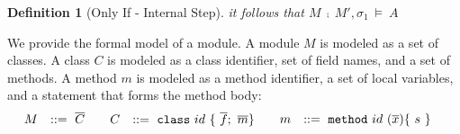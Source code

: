 \documentclass[12pt]{article}
\newcommand\intstep{\hspace{1.5mm}{\raisebox{3pt}{$\bullet$}}\hspace{-1.5mm}{\hookrightarrow}}
\newcommand\hoare[3]{\{#1\}\ #2\ \{#3\}}
\newcommand\hoareIf[4]{#1,\ #2,\ \{#3\}\ \intstep\ #4}
\newcommand\access[2]{\langle #1\ \texttt{access}\ #2 \rangle}
\newcommand\external[1]{\langle #1\ \texttt{external}\rangle}
\newtheorem{definition}{Definition}
\numberwithin{case}{lemma}
\numberwithin{case}{theorem}
\numberwithin{subcase}{case}
\begin{document}
{\begin{definition}[Only If - Internal Step]
it follows that $M\ \fcmp\ M', \sigma_1\ \vDash\ A$
\end{definition}
We provide the 
formal model of a module.
A module $M$ is modeled as a set of classes. A class $C$ is
modeled as a class identifier, set of field names, and a set of methods. 
A method $m$ is modeled as a method identifier, a set of local variables,
and a statement that forms the method body:
\[
\begin{array}{llr}
M & ::=\  \overline{C} &
\end{array}\\
\begin{array}{llr}
C & ::=\  \texttt{class}\ id\ \{\ \overline{f};\ \overline{m}\}  &
\end{array}\\
\begin{array}{llr}
m & ::=\  \texttt{method}\ id\ (\overline{x}) \{\ s\ \}  &
\end{array}
\]
}
\end{document}
